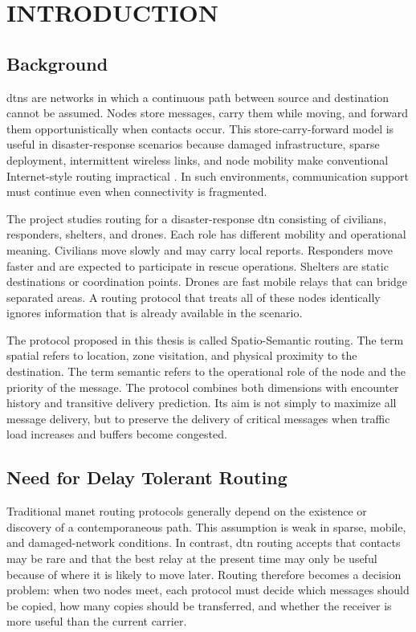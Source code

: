 \chapter{\MakeUppercase{Introduction}}
\justifying
\section{Background}
\acp{dtn} are networks in which a continuous path between source and destination cannot be assumed. Nodes store messages, carry them while moving, and forward them opportunistically when contacts occur. This store-carry-forward model is useful in disaster-response scenarios because damaged infrastructure, sparse deployment, intermittent wireless links, and node mobility make conventional Internet-style routing impractical \citep{cerf2007dtn}. In such environments, communication support must continue even when connectivity is fragmented.

The project studies routing for a disaster-response \ac{dtn} consisting of civilians, responders, shelters, and drones. Each role has different mobility and operational meaning. Civilians move slowly and may carry local reports. Responders move faster and are expected to participate in rescue operations. Shelters are static destinations or coordination points. Drones are fast mobile relays that can bridge separated areas. A routing protocol that treats all of these nodes identically ignores information that is already available in the scenario.

The protocol proposed in this thesis is called Spatio-Semantic routing. The term spatial refers to location, zone visitation, and physical proximity to the destination. The term semantic refers to the operational role of the node and the priority of the message. The protocol combines both dimensions with encounter history and transitive delivery prediction. Its aim is not simply to maximize all message delivery, but to preserve the delivery of critical messages when traffic load increases and buffers become congested.

\section{Need for Delay Tolerant Routing}
Traditional \ac{manet} routing protocols generally depend on the existence or discovery of a contemporaneous path. This assumption is weak in sparse, mobile, and damaged-network conditions. In contrast, \ac{dtn} routing accepts that contacts may be rare and that the best relay at the present time may only be useful because of where it is likely to move later. Routing therefore becomes a decision problem: when two nodes meet, each protocol must decide which messages should be copied, how many copies should be transferred, and whether the receiver is more useful than the current carrier.

